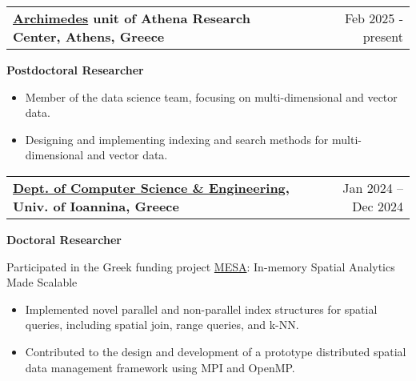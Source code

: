 \documentclass[a4paper,12pt]{article}
\makeatletter
\newenvironment{job}[2]
{
	\begin{tabularx}{\linewidth}{@{}l X r@{}}
		\small
		\textbf{#1} & \hfill &  #2 \\[3.75pt]
	\end{tabularx}
	\begin{minipage}[t]{\linewidth}
		\footnotesize
		\setlength{\parskip}{3pt} %
		\setlength{\parindent}{0pt} %
	}
	{
	\end{minipage}    
}
\makeatother
\begin{document}
\begin{job}{\href{https://archimedesai.gr/en/}{Archimedes} unit of Athena Research Center, Athens, Greece}{Feb 2025 - present}
\textbf{Postdoctoral Researcher}

\begin{itemize}

\item Member of the data science team, focusing on multi-dimensional and vector data.
\item Designing and implementing indexing and search methods for multi-dimensional and vector data.
\end{itemize}

\end{job}


\begin{job}{\href{https://www.cse.uoi.gr/?lang=en}{Dept. of Computer Science \& Engineering}, Univ. of Ioannina, Greece}{Jan 2024 – Dec 2024}
	\textbf{Doctoral Researcher}
	
	Participated in the Greek funding project \href {https://www.cs.uoi.gr/~nikos/mesa/}{MESA}: In-memory Spatial Analytics Made Scalable 
	
	\begin{itemize}
		
		\item Implemented novel parallel and non-parallel index structures for spatial queries, including spatial join, range queries, and k-NN.
		
		\item Contributed to the design and development of a prototype distributed spatial data management framework using MPI and OpenMP.
		
	\end{itemize}
	
\end{job}

\vspace{-1.2\baselineskip}
\end{document}
